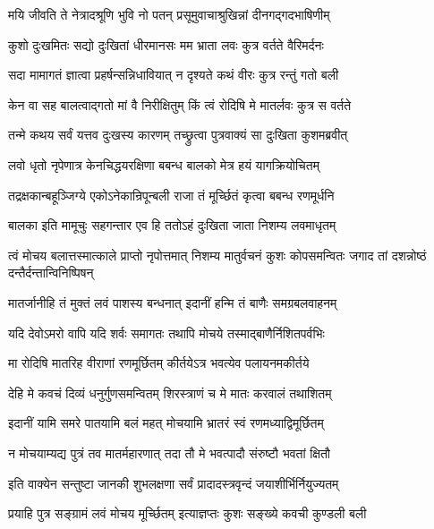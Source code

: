 \twolineshloka
{मयि जीवति ते नेत्रादश्रूणि भुवि नो पतन्}
{प्रसूमुवाचाश्रुखिन्नां दीनगद्गदभाषिणीम्}%

\twolineshloka
{कुशो दुःखमितः सद्यो दुःखितां धीरमानसः}
{मम भ्राता लवः कुत्र वर्तते वैरिमर्दनः}%

\twolineshloka
{सदा मामागतं ज्ञात्वा प्रहर्षन्सन्निधावियात्}
{न दृश्यते कथं वीरः कुत्र रन्तुं गतो बली}%

\twolineshloka
{केन वा सह बालत्वाद्गतो मां वै निरीक्षितुम्}
{किं त्वं रोदिषि मे मातर्लवः कुत्र स वर्तते}%

\twolineshloka
{तन्मे कथय सर्वं यत्तव दुःखस्य कारणम्}
{तच्छ्रुत्वा पुत्रवाक्यं सा दुःखिता कुशमब्रवीत्}%

\twolineshloka
{लवो धृतो नृपेणात्र केनचिद्धयरक्षिणा}
{बबन्ध बालको मेत्र हयं यागक्रियोचितम्}%

\twolineshloka
{तद्रक्षकान्बहूञ्जिग्ये एकोऽनेकान्रिपून्बली}
{राजा तं मूर्च्छितं कृत्वा बबन्ध रणमूर्धनि}%

\twolineshloka
{बालका इति मामूचुः सहगन्तार एव हि}
{ततोऽहं दुःखिता जाता निशम्य लवमाधृतम्}%


\threelineshloka
{त्वं मोचय बलात्तस्मात्काले प्राप्तो नृपोत्तमात्}
{निशम्य मातुर्वचनं कुशः कोपसमन्वितः}
{जगाद तां दशन्नोष्ठं दन्तैर्दन्तान्विनिष्पिषन्}%


\twolineshloka
{मातर्जानीहि तं मुक्तं लवं पाशस्य बन्धनात्}
{इदानीं हन्मि तं बाणैः समग्रबलवाहनम्}%

\twolineshloka
{यदि देवोऽमरो वापि यदि शर्वः समागतः}
{तथापि मोचये तस्माद्बाणैर्निशितपर्वभिः}%

\twolineshloka
{मा रोदिषि मातरिह वीराणां रणमूर्छितम्}
{कीर्तयेऽत्र भवत्येव पलायनमकीर्तये}%

\twolineshloka
{देहि मे कवचं दिव्यं धनुर्गुणसमन्वितम्}
{शिरस्त्राणं च मे मातः करवालं तथाशितम्}%

\twolineshloka
{इदानीं यामि समरे पातयामि बलं महत्}
{मोचयामि भ्रातरं स्वं रणमध्याद्विमूर्छितम्}%

\twolineshloka
{न मोचयाम्यद्य पुत्रं तव मातर्महारणात्}
{तदा तौ मे भवत्पादौ संरुष्टौ भवतां क्षितौ}%


\twolineshloka
{इति वाक्येन सन्तुष्टा जानकी शुभलक्षणा}
{सर्वं प्रादादस्त्रवृन्दं जयाशीर्भिर्नियुज्यतम्}%

\twolineshloka
{प्रयाहि पुत्र सङ्ग्रामं लवं मोचय मूर्च्छितम्}
{इत्याज्ञप्तः कुशः सङ्ख्ये कवची कुण्डली बली}%

